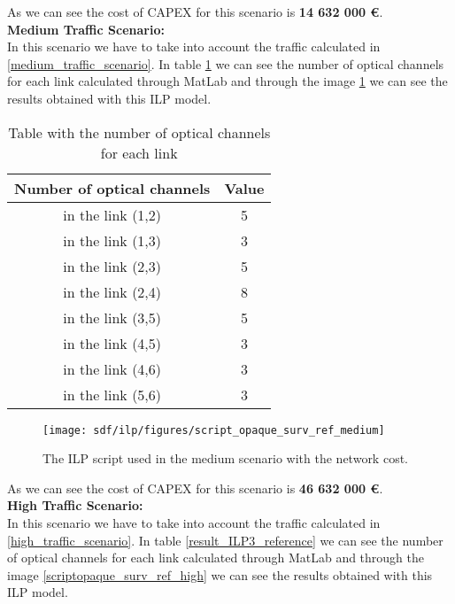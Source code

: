 As we can see the cost of CAPEX for this scenario is \textbf{14 632 000 \euro}.\\

\newpage
\textbf{Medium Traffic Scenario:}\\

In this scenario we have to take into account the traffic calculated in \ref{medium_traffic_scenario}. In table \ref{result_ILP2_reference} we can see the number of optical channels for each link calculated through MatLab and through the image \ref{scriptopaque_surv_ref_medium} we can see the results obtained with this ILP model.\\

\begin{table}[h!]
\centering
\begin{tabular}{|| c | c||}
 \hline
 Number of optical channels & Value \\
 \hline\hline
 in the link (1,2) & 5 \\
 in the link (1,3) & 3 \\
 in the link (2,3) & 5 \\
 in the link (2,4) & 8 \\
 in the link (3,5) & 5 \\
 in the link (4,5) & 3 \\
 in the link (4,6) & 3 \\
 in the link (5,6) & 3 \\
 \hline
\end{tabular}
\caption{Table with the number of optical channels for each link}
\label{result_ILP2_reference}
\end{table}


\begin{figure}[h!]
\centering
\texttt{[image: sdf/ilp/figures/script\_opaque\_surv\_ref\_medium]}
\caption{The ILP script used in the medium scenario with the network cost.}
\label{scriptopaque_surv_ref_medium}
\end{figure}

As we can see the cost of CAPEX for this scenario is \textbf{46 632 000 \euro}.\\

\newpage
\textbf{High Traffic Scenario:}\\

In this scenario we have to take into account the traffic calculated in \ref{high_traffic_scenario}. In table \ref{result_ILP3_reference} we can see the number of optical channels for each link calculated through MatLab and through the image \ref{scriptopaque_surv_ref_high} we can see the results obtained with this ILP model.\\

